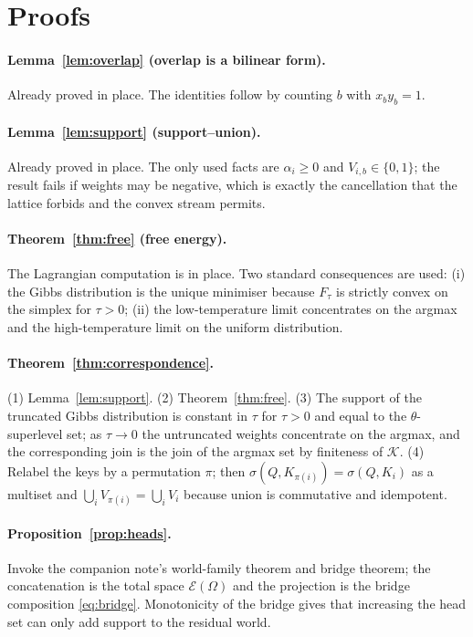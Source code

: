 \documentclass[11pt,a4paper]{article}
\theoremstyle{remark}
\newcommand{\sigm}{\ensuremath{\sigma}}                 %
\begin{document}
\section{Proofs}
\label{app:proofs}

\paragraph{Lemma~\ref{lem:overlap} (overlap is a bilinear form).} Already proved
in place. The identities follow by counting $b$ with $x_by_b=1$.

\paragraph{Lemma~\ref{lem:support} (support--union).} Already proved in place.
The only used facts are $\alpha_i\ge0$ and $V_{i,b}\in\{0,1\}$; the result fails
if weights may be negative, which is exactly the cancellation that the lattice
forbids and the convex stream permits.

\paragraph{Theorem~\ref{thm:free} (free energy).} The Lagrangian computation is
in place. Two standard consequences are used: (i) the Gibbs distribution is the
unique minimiser because $F_\tau$ is strictly convex on the simplex for $\tau>0$;
(ii) the low-temperature limit concentrates on the argmax and the
high-temperature limit on the uniform distribution.

\paragraph{Theorem~\ref{thm:correspondence}.} (1) Lemma~\ref{lem:support}.
(2) Theorem~\ref{thm:free}. (3) The support of the truncated Gibbs distribution
is constant in $\tau$ for $\tau>0$ and equal to the $\theta$-superlevel set; as
$\tau\to0$ the untruncated weights concentrate on the argmax, and the
corresponding join is the join of the argmax set by finiteness of
$\mathcal{K}$. (4) Relabel the keys by a permutation $\pi$; then
$\sigm(Q,K_{\pi(i)})=\sigm(Q,K_i)$ as a multiset and
$\bigcup_i V_{\pi(i)}=\bigcup_i V_i$ because union is commutative and
idempotent.

\paragraph{Proposition~\ref{prop:heads}.} Invoke the companion note's
world-family theorem and bridge theorem; the concatenation is the total space
$\mathcal{E}(\Omega)$ and the projection is the bridge composition
\eqref{eq:bridge}. Monotonicity of the bridge gives that increasing the head
set can only add support to the residual world.
\end{document}
